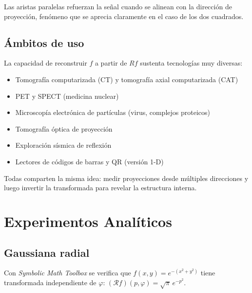 \documentclass[11pt]{article}
\begin{document}
Las aristas paralelas refuerzan la señal cuando se alinean con la
dirección de proyección, fenómeno que se aprecia claramente en el caso
de los dos cuadrados.

\subsection*{Ámbitos de uso}

La capacidad de reconstruir $f$ a partir de $Rf$ sustenta tecnologías
muy diversas:

\begin{itemize}\itemsep0.3em
\item Tomografía computarizada (CT) y tomografía axial computarizada (CAT)
\item PET y SPECT (medicina nuclear)
\item Microscopía electrónica de partículas (virus, complejos proteicos)
\item Tomografía óptica de proyección
\item Exploración sísmica de reflexión
\item Lectores de códigos de barras y QR (versión 1-D)
\end{itemize}

Todas comparten la misma idea: medir proyecciones desde múltiples
direcciones y luego invertir la transformada para revelar la estructura
interna.

\section{Experimentos Analíticos}

\subsection{Gaussiana radial}

Con \textit{Symbolic Math Toolbox} se verifica que
$f(x,y)=e^{-(x^{2}+y^{2})}$ tiene transformada independiente de
$\varphi$:
$(\mathcal Rf)(p,\varphi)=\sqrt{\pi}\,e^{-p^{2}}$.
\end{document}
